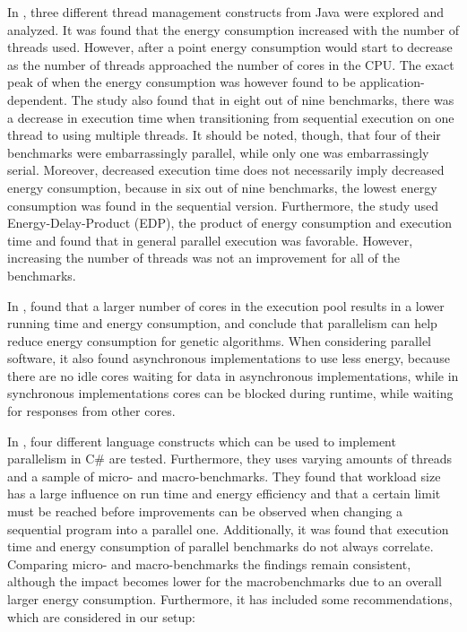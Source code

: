 In \cite{Pinto2014}, three different thread management constructs from Java were explored and analyzed. It was found that the energy consumption increased with the number of threads used. However, after a point energy consumption would start to decrease as the number of threads approached the number of cores in the CPU. The exact peak of when the energy consumption was however found to be application-dependent. The study also found that in eight out of nine benchmarks, there was a decrease in execution time when transitioning from sequential execution on one thread to using multiple threads. It should be noted, though, that four of their benchmarks were embarrassingly parallel, while only one was embarrassingly serial. Moreover, decreased execution time does not necessarily imply decreased energy consumption, because in six out of nine benchmarks, the lowest energy consumption was found in the sequential version. Furthermore, the study used Energy-Delay-Product (EDP), the product of energy consumption and execution time and found that in general parallel execution was favorable. However, increasing the number of threads was not an improvement for all of the benchmarks.\cite{Pinto2014}

In \cite{abdelhafez2019}, found that a larger number of cores in the execution pool results in a lower running time and energy consumption, and conclude that parallelism can help reduce energy consumption for genetic algorithms. %
When considering parallel software, it also found asynchronous implementations to use less energy, because there are no idle cores waiting for data in asynchronous implementations, while in synchronous implementations cores can be blocked during runtime, while waiting for responses from other cores.

In \cite{Lindholt2022}, %
four different language constructs which can be used to implement parallelism in C\# are tested. Furthermore, they uses varying amounts of threads and a sample of micro- and macro-benchmarks. They found that workload size has a large influence on run time and energy efficiency and that a certain limit must be reached before improvements can be observed when changing a sequential program into a parallel one. Additionally, it was found that execution time and energy consumption of parallel benchmarks do not always correlate. Comparing micro- and macro-benchmarks the findings remain consistent, although the impact becomes lower for the macrobenchmarks due to an overall larger energy consumption. Furthermore, it has included some recommendations, which are considered in our setup:\cite{Lindholt2022}

